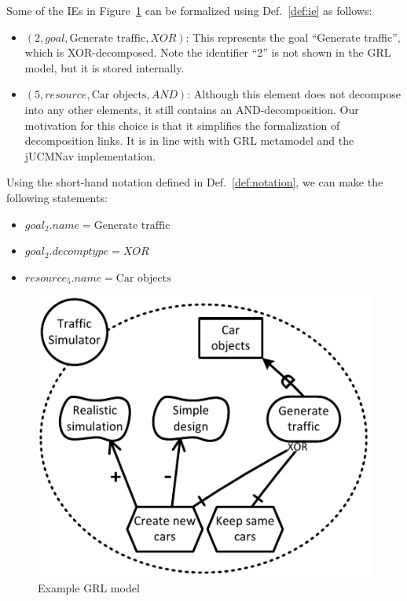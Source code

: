 Some of the IEs in Figure~\ref{fig:example-small2} can be formalized using Def.~\ref{def:ie} as follows:
\begin{itemize}
\item $(2, goal, \text{Generate traffic}, XOR)$: This represents the goal ``Generate traffic'', which is XOR-decomposed. Note the identifier ``2'' is not shown in the GRL model, but it is stored internally.
\item $(5, resource, \text{Car objects}, AND)$: Although this element does not decompose into any other elements, it still contains an AND-decomposition. Our motivation for this choice is that it simplifies the formalization of decomposition links. It is in line with with GRL metamodel and the jUCMNav implementation.
\end{itemize}

Using the short-hand notation defined in Def.~\ref{def:notation}, we can make the following statements:
\begin{itemize}
\item $goal_2.name = \text{Generate traffic}$
\item $goal_2.decomptype = XOR$
\item $resource_5.name = \text{Car objects}$
\end{itemize}

\begin{figure}[ht]
\centering
\includegraphics[width=\columnwidth]{img/Example1-new.pdf}
\caption{Example GRL model}
\label{fig:example-small2}
\end{figure} 

